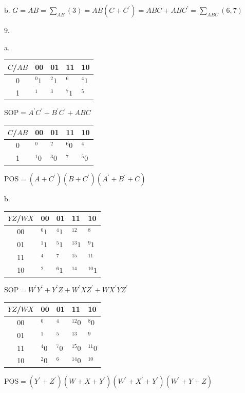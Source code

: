 \documentclass[UTF8,12pt,letterpaper,oneside]{amsart}
\begin{document}
b. $G = AB = \sum_{AB}(3) = AB(C + C^\prime) = ABC + ABC^\prime = \sum_{ABC}(6, 7)$

9.

a.

\begin{tabular}{c|llll}
$C$/$AB$ & 00 & 01 & 11 & 10\\\hline
0 & ${}^0 1$ & ${}^2 1$ & ${}^6$ & ${}^4 1$\\\hline
1 & ${}^1$ & ${}^3$ & ${}^7 1$ & ${}^5$
\end{tabular}

SOP$ = A^\prime C^\prime + B^\prime C^\prime + ABC$

\begin{tabular}{c|llll}
$C$/$AB$ & 00 & 01 & 11 & 10\\\hline
0 & ${}^0$ & ${}^2$ & ${}^6 0$ & ${}^4$\\\hline
1 & ${}^1 0$ & ${}^3 0$ & ${}^7$ & ${}^5 0$
\end{tabular}

POS$ = (A + C^\prime)(B + C^\prime)(A^\prime + B^\prime + C)$

b.

\begin{tabular}{c|llll}
$YZ$/$WX$ & 00 & 01 & 11 & 10\\\hline
00 & ${}^0 1$ & ${}^4 1$ & ${}^{12}$ & ${}^8$\\\hline
01 & ${}^1 1$ & ${}^5 1$ & ${}^{13} 1$ & ${}^9 1$\\\hline
11 & ${}^4$ & ${}^7$ & ${}^{15}$ & ${}^{11}$\\\hline
10 & ${}^2$ & ${}^6 1$ & ${}^{14}$ & ${}^{10} 1$\\\hline
\end{tabular}

SOP$ = W^\prime Y^\prime + Y^\prime Z + W^\prime X Z^\prime + WX^\prime Y Z^\prime$

\begin{tabular}{c|llll}
$YZ$/$WX$ & 00 & 01 & 11 & 10\\\hline
00 & ${}^0$ & ${}^4$ & ${}^{12} 0$ & ${}^8 0$\\\hline
01 & ${}^1$ & ${}^5$ & ${}^{13}$ & ${}^9$\\\hline
11 & ${}^4 0$ & ${}^7 0$ & ${}^{15} 0$ & ${}^{11} 0$\\\hline
10 & ${}^2 0$ & ${}^6$ & ${}^{14} 0$ & ${}^{10}$\\\hline
\end{tabular}

POS$= (Y^\prime + Z^\prime)(W + X + Y^\prime)(W^\prime + X^\prime + Y^\prime)(W^\prime + Y + Z)$
\end{document}
